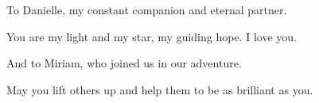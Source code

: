 %
%

\begin{dedication}
    To Danielle, my constant companion and eternal partner.
    
    You are my light and my star, my guiding hope.
    I love you.
\newline
\newline

    And to Miriam, who joined us in our adventure.
    
    May you lift others up and help them to be as brilliant as you.
% 
\end{dedication}
